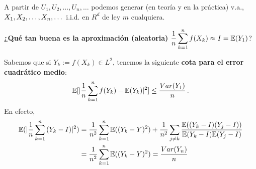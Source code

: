 A partir de $U_1,U_2,\dots,U_n,\dots$ podemos generar (en teoría y en la práctica) v.a., $X_1,X_2,\dots,X_n,\dots$ i.i.d. en $R^d$ de ley $m$ cualquiera.

%
%
\newp \textbf{¿Qué tan buena es la aproximación (aleatoria)} $\displaystyle\frac{1}{n}\sum^n_{k=1}f(X_k)\approx I=\mathbb{E}(Y_1)$?

Sabemos que si $Y_k:=f(X_k)\in L^2$, tenemos la siguiente \textbf{cota para el error cuadrático medio}:
$$ \mathbb{E}[|\displaystyle\frac{1}{n}\sum^n_{k=1}f(Y_k)-\mathbb{E}(Y_k)|^2]\leq\frac{Var(Y_1)}{n} \, .$$
En efecto,
\begin{alignat*}{2}
   \mathbb{E}(|\displaystyle\frac{1}{n}\sum^n_{k=1}{(Y_k-I)}|^2) &  =  \displaystyle\frac{1}{n^2}\sum_{k=1}^n\mathbb{E}((Y_k-Y)^2)+\frac{1}{n^2}\sum_{j\neq k}\frac{\mathbb{E}((Y_k-I)(Y_j-I))}{\mathbb{E}(Y_k-I)\mathbb{E}(Y_j-I)} \\
     & = \displaystyle\frac{1}{n^2}\sum_{k=1}^n\mathbb{E}((Y_k-Y)^2)=\frac{Var(Y_n)}{n}
\end{alignat*}

